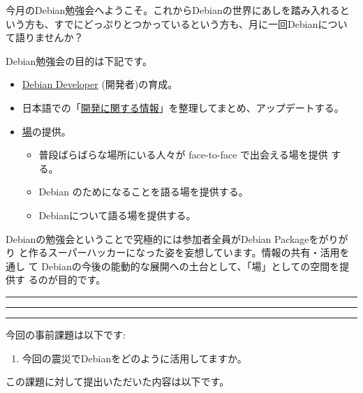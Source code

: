 \documentclass[mingoth,a4paper]{jsarticle}
\begin{document}
\begin{multicols}{2}
 

 今月のDebian勉強会へようこそ。これからDebianの世界にあしを踏み入れると
 いう方も、すでにどっぷりとつかっているという方も、月に一回Debianについ
 て語りませんか？

 Debian勉強会の目的は下記です。

 \begin{itemize}
 \item \underline{Debian Developer} (開発者)の育成。
 \item 日本語での「\underline{開発に関する情報}」を整理してまとめ、アップデートする。
 \item \underline{場}の提供。
 \begin{itemize}
  \item 普段ばらばらな場所にいる人々が face-to-face で出会える場を提供
	する。
  \item Debian のためになることを語る場を提供する。
  \item Debianについて語る場を提供する。
 \end{itemize}
 \end{itemize}		

 Debianの勉強会ということで究極的には参加者全員がDebian Packageをがりがり
 と作るスーパーハッカーになった姿を妄想しています。情報の共有・活用を通し
 て Debianの今後の能動的な展開への土台として、「場」としての空間を提供す
 るのが目的です。

\end{multicols}

\newpage

\begin{minipage}[b]{0.2\hsize}
 \colorbox{titleback}{}
\end{minipage}
\begin{minipage}[b]{0.8\hsize}
\hrule
\vspace{2mm}
\hrule
\begin{multicols}{2}
\tableofcontents
\end{multicols}
\vspace{2mm}
\hrule
\end{minipage}


今回の事前課題は以下です:
\begin{enumerate}
 \item 今回の震災でDebianをどのように活用してますか。
\end{enumerate}
この課題に対して提出いただいた内容は以下です。
\begin{multicols}{2}
{\small

}
\end{multicols}
\end{document}
